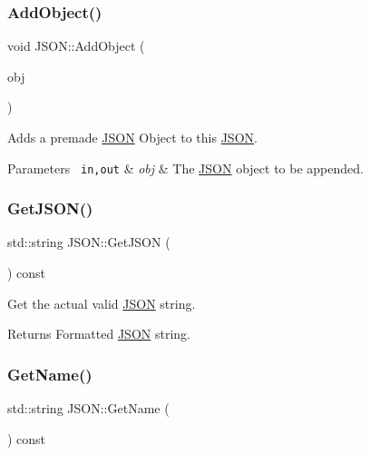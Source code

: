 \subsubsection{\texorpdfstring{AddObject()}{AddObject()}\hspace{0.1cm}{\footnotesize\ttfamily [2/2]}}
{\footnotesize\ttfamily void J\+S\+O\+N\+::\+Add\+Object (\begin{DoxyParamCaption}\item[{\mbox{\hyperlink{class_j_s_o_n}{J\+S\+ON}} \&}]{obj }\end{DoxyParamCaption})}

Adds a premade \mbox{\hyperlink{class_j_s_o_n}{J\+S\+ON}} Object to this \mbox{\hyperlink{class_j_s_o_n}{J\+S\+ON}}. 
\begin{DoxyParams}[1]{Parameters}
\mbox{\texttt{ in,out}}  & {\em obj} & The \mbox{\hyperlink{class_j_s_o_n}{J\+S\+ON}} object to be appended. \\
\hline
\end{DoxyParams}
\mbox{\label{class_j_s_o_n_a879475ff669a2f155f3528fc9396ad40}} 
\subsubsection{\texorpdfstring{GetJSON()}{GetJSON()}}
{\footnotesize\ttfamily std\+::string J\+S\+O\+N\+::\+Get\+J\+S\+ON (\begin{DoxyParamCaption}{ }\end{DoxyParamCaption}) const}

Get the actual valid \mbox{\hyperlink{class_j_s_o_n}{J\+S\+ON}} string. \begin{DoxyReturn}{Returns}
Formatted \mbox{\hyperlink{class_j_s_o_n}{J\+S\+ON}} string. 
\end{DoxyReturn}
\mbox{\label{class_j_s_o_n_ad9a0666a627ced324d1676188362f8b6}} 
\subsubsection{\texorpdfstring{GetName()}{GetName()}}
{\footnotesize\ttfamily std\+::string J\+S\+O\+N\+::\+Get\+Name (\begin{DoxyParamCaption}{ }\end{DoxyParamCaption}) const}

